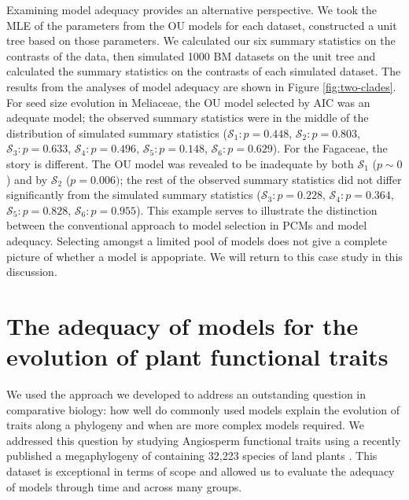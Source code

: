 \documentclass[a4paper,12pt]{article}
\begin{document}
Examining model adequacy provides an alternative perspective. We took the MLE of the parameters from the OU models for each dataset, constructed a unit tree based on those parameters. We calculated our six summary statistics on the contrasts of the data, then simulated 1000 BM datasets on the unit tree and calculated the summary statistics on the contrasts of each simulated dataset. The results from the analyses of model adequacy are shown in Figure \ref{fig:two-clades}. For seed size evolution in Meliaceae, the OU model selected by AIC was an adequate model; the observed summary statistics were in the middle of the distribution of simulated summary statistics ($\mathcal{S}_1: p=0.448$, $\mathcal{S}_2: p=0.803$, $\mathcal{S}_3: p=0.633$, $\mathcal{S}_4:p=0.496$, $\mathcal{S}_5: p=0.148$, $\mathcal{S}_6: p=0.629$). For the Fagaceae, the story is different. The OU model was revealed to be inadequate by both $\mathcal{S}_1$ ($p \sim 0$) and by $\mathcal{S}_2$ ($p=0.006)$; the rest of the observed summary statistics did not differ significantly from the simulated summary statistics ($\mathcal{S}_3: p=0.228$, $\mathcal{S}_4:p=0.364$, $\mathcal{S}_5: p=0.828$, $\mathcal{S}_6: p=0.955$). This example serves to illustrate the distinction between the conventional approach to model selection in PCMs and model adequacy. Selecting amongst a limited pool of models does not give a complete picture of whether a model is appopriate. We will return to this case study in this discussion.


\section{The adequacy of models for the evolution of plant functional traits}

We used the approach we developed to address an outstanding question in comparative biology: how well do commonly used models explain the evolution of traits along a phylogeny and when are more complex models required. We addressed this question by studying Angiosperm functional traits using a recently published a megaphylogeny of containing 32,223 species of land plants \citep{Zanne}. This dataset is exceptional in terms of scope and allowed us to evaluate the adequacy of models through time and across many groups.  
\end{document}
